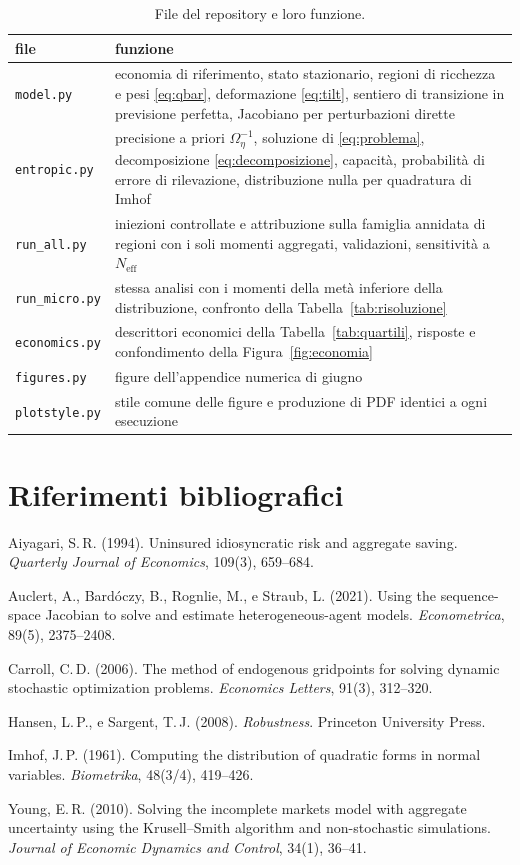 \documentclass[11pt,a4paper]{article}
\newcommand{\Neff}{N_{\mathrm{eff}}}
\begin{document}
\begin{table}[H]
\centering\small
\caption{File del repository e loro funzione.}
\label{tab:codice}
\begin{tabular}{lp{11cm}}
\toprule
file & funzione\\
\midrule
\texttt{model.py} & economia di riferimento, stato stazionario, regioni di ricchezza e pesi \eqref{eq:qbar}, deformazione \eqref{eq:tilt}, sentiero di transizione in previsione perfetta, Jacobiano per perturbazioni dirette\\
\texttt{entropic.py} & precisione a priori $\Omega_\eta^{-1}$, soluzione di \eqref{eq:problema}, decomposizione \eqref{eq:decomposizione}, capacità, probabilità di errore di rilevazione, distribuzione nulla per quadratura di Imhof\\
\texttt{run\_all.py} & iniezioni controllate e attribuzione sulla famiglia annidata di regioni con i soli momenti aggregati, validazioni, sensitività a $\Neff$\\
\texttt{run\_micro.py} & stessa analisi con i momenti della metà inferiore della distribuzione, confronto della Tabella~\ref{tab:risoluzione}\\
\texttt{economics.py} & descrittori economici della Tabella~\ref{tab:quartili}, risposte e confondimento della Figura~\ref{fig:economia}\\
\texttt{figures.py} & figure dell'appendice numerica di giugno\\
\texttt{plotstyle.py} & stile comune delle figure e produzione di PDF identici a ogni esecuzione\\
\bottomrule
\end{tabular}
\end{table}

\section*{Riferimenti bibliografici}
{\small\setlength{\parindent}{0pt}\setlength{\parskip}{3pt}
Aiyagari, S.\,R. (1994). Uninsured idiosyncratic risk and aggregate saving. \emph{Quarterly Journal of Economics}, 109(3), 659--684.

Auclert, A., Bardóczy, B., Rognlie, M., e Straub, L. (2021). Using the sequence-space Jacobian to solve and estimate heterogeneous-agent models. \emph{Econometrica}, 89(5), 2375--2408.

Carroll, C.\,D. (2006). The method of endogenous gridpoints for solving dynamic stochastic optimization problems. \emph{Economics Letters}, 91(3), 312--320.

Hansen, L.\,P., e Sargent, T.\,J. (2008). \emph{Robustness}. Princeton University Press.

Imhof, J.\,P. (1961). Computing the distribution of quadratic forms in normal variables. \emph{Biometrika}, 48(3/4), 419--426.

Young, E.\,R. (2010). Solving the incomplete markets model with aggregate uncertainty using the Krusell--Smith algorithm and non-stochastic simulations. \emph{Journal of Economic Dynamics and Control}, 34(1), 36--41.
\par}
\end{document}
